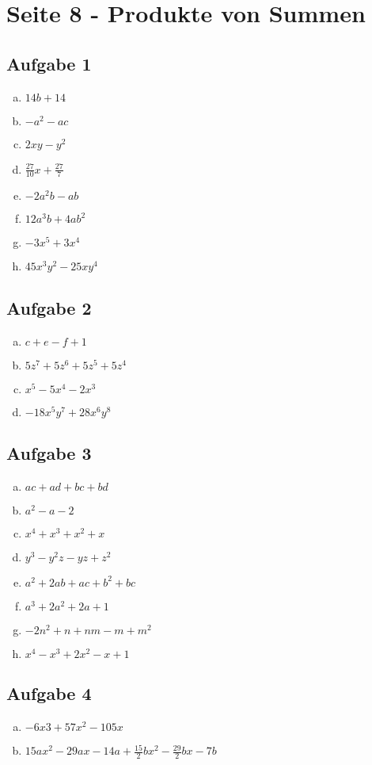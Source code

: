 \newpage

\section*{Seite 8 - Produkte von Summen}
\subsection*{Aufgabe 1}
\begin{multicols}{2}
	\begin{enumerate}[a)]
		\item $14b+14$
		\item $-a^2-ac$
		\item $2xy-y^2$
		\item $\frac{27}{10}x+\frac{27}{7}$
		\item $-2a^2b-ab$
		\item $12a^3b+4ab^2$
		\item $-3x^5+3x^4$
		\item $45x^3y^2-25xy^4$
	\end{enumerate}
\end{multicols}

\subsection*{Aufgabe 2}
\begin{multicols}{2}
	\begin{enumerate}[a)]
		\item $c+e-f+1$
		\item $5z^7+5z^6+5z^5+5z^4$
		\item $x^5-5x^4-2x^3$
		\item $-18x^5y^7+28x^6y^8$
	\end{enumerate}
\end{multicols}

\subsection*{Aufgabe 3}
\begin{multicols}{2}
	\begin{enumerate}[a)]
		\item $ac+ad+bc+bd$
		\item $a^2-a-2$
		\item $x^4+x^3+x^2+x$
		\item $y^3-y^2z-yz+z^2$
		\item $a^2+2ab+ac+b^2+bc$
		\item $a^3+2a^2+2a+1$
		\item $-2n^2+n+nm-m+m^2$
		\item $x^4-x^3+2x^2-x+1$
	\end{enumerate}
\end{multicols}

\subsection*{Aufgabe 4}
	\begin{enumerate}[a)]
		\item $-6x3+57x^2-105x$
		\item $15ax^2-29ax-14a+\frac{15}{2}bx^2-\frac{29}{2}bx-7b$
	\end{enumerate}
\scriptEnde{}
